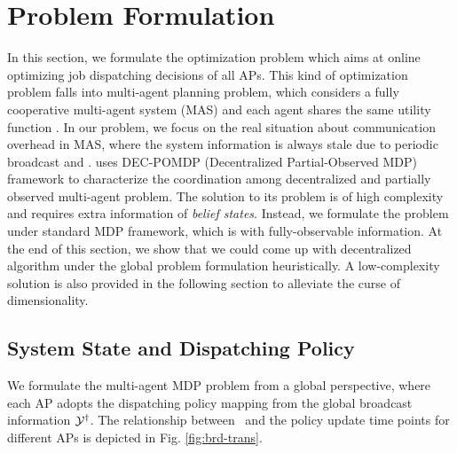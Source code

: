 \section{Problem Formulation}
In this section, we formulate the optimization problem which aims at online optimizing job dispatching decisions of all APs.
This kind of optimization problem falls into multi-agent planning problem, which considers a fully cooperative multi-agent system (MAS) and each agent shares the same utility function .
In our problem, we focus on the real situation about communication overhead in MAS, where the system information is always stale due to periodic broadcast and \brdelay.
 uses DEC-POMDP (Decentralized Partial-Observed MDP) framework to characterize the coordination among decentralized and partially observed multi-agent problem. The solution to its problem is of high complexity and requires extra information of \emph{belief states}.
Instead, we formulate the problem under standard MDP framework, which is with fully-observable information.
At the end of this section, we show that we could come up with decentralized algorithm under the global problem formulation heuristically. A low-complexity solution is also provided in the following section to alleviate the curse of dimensionality.

\subsection{System State and Dispatching Policy}
We formulate the multi-agent MDP problem from a global perspective, where each AP adopts the dispatching policy mapping from the global broadcast information $\mathcal{Y}^{\dagger}$.
The relationship between \brdelay~and the policy update time points for different APs is depicted in Fig. \ref{fig:brd-trans}.


